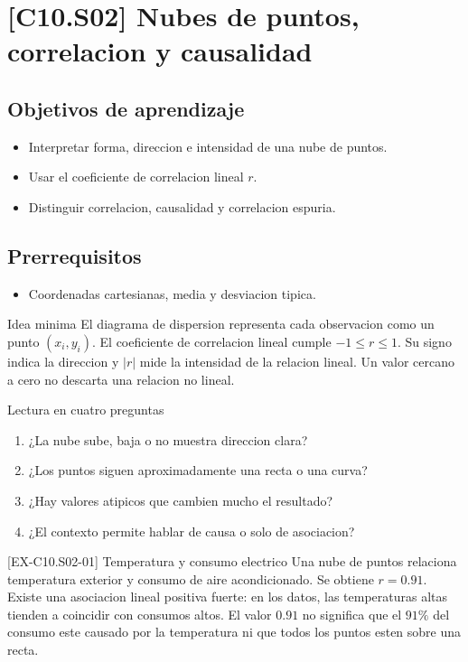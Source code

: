 \section{[C10.S02] Nubes de puntos, correlacion y causalidad}

\subsection*{Objetivos de aprendizaje}
\begin{itemize}
  \item Interpretar forma, direccion e intensidad de una nube de puntos.
  \item Usar el coeficiente de correlacion lineal \(r\).
  \item Distinguir correlacion, causalidad y correlacion espuria.
\end{itemize}

\subsection*{Prerrequisitos}
\begin{itemize}
  \item Coordenadas cartesianas, media y desviacion tipica.
\end{itemize}

\begin{theorybox}{Idea minima}
El diagrama de dispersion representa cada observacion como un punto \((x_i,y_i)\). El coeficiente
de correlacion lineal cumple \(-1\le r\le 1\). Su signo indica la direccion y \(|r|\) mide la
intensidad de la relacion lineal. Un valor cercano a cero no descarta una relacion no lineal.
\end{theorybox}

\begin{methodbox}{Lectura en cuatro preguntas}
\begin{enumerate}
  \item ¿La nube sube, baja o no muestra direccion clara?
  \item ¿Los puntos siguen aproximadamente una recta o una curva?
  \item ¿Hay valores atipicos que cambien mucho el resultado?
  \item ¿El contexto permite hablar de causa o solo de asociacion?
\end{enumerate}
\end{methodbox}

\begin{solvedexample}{[EX-C10.S02-01] Temperatura y consumo electrico}
Una nube de puntos relaciona temperatura exterior y consumo de aire acondicionado. Se obtiene
\(r=0.91\). Existe una asociacion lineal positiva fuerte: en los datos, las temperaturas altas
tienden a coincidir con consumos altos. El valor \(0.91\) no significa que el \(91\%\) del consumo
este causado por la temperatura ni que todos los puntos esten sobre una recta.
\end{solvedexample}

